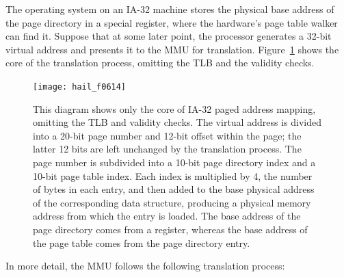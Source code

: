 The operating system on an IA-32 machine stores the physical base
address of the page directory in a special register, where the
hardware's page table walker can find it.  Suppose that at some later
point, the processor generates a 32-bit virtual address and presents
it to the MMU for translation.  
Figure~\ref{scan-6-8} shows the core of the translation process,
omitting the TLB and the validity checks.
\begin{figure}
\centerline{\texttt{[image: hail\_f0614]}}
\caption{This diagram shows only the core of IA-32 paged address
  mapping, omitting the TLB and validity checks.  The virtual address
  is divided into a 20-bit page number and 12-bit offset within the
  page; the latter 12 bits are left unchanged by the translation
  process.  The page number is subdivided into a 10-bit page directory
  index and a 10-bit page table index.  Each index is multiplied by
  4, the number of bytes in each entry, and then added to the base
  physical address of the corresponding data structure, producing a
  physical memory address from which the entry is loaded.  The base
  address of the page directory comes from a register, whereas the
  base address of the page table comes from the page directory entry.}
\label{scan-6-8}
\end{figure}
In more detail, the MMU follows the following
translation process:
